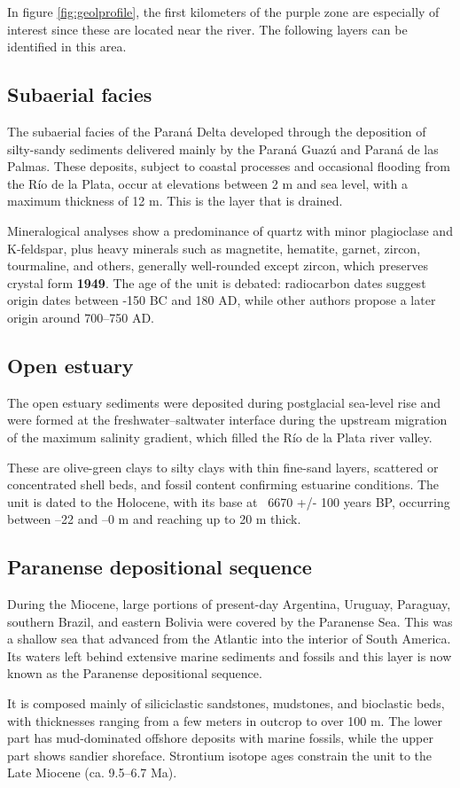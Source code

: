 In figure \ref{fig:geolprofile}, the first kilometers of the purple zone are especially of interest since these are located near the river. The following layers can be identified in this area.

\subsection{Subaerial facies}
The subaerial facies of the Paraná Delta developed through the deposition of silty-sandy sediments delivered mainly by the Paraná Guazú and Paraná de las Palmas. These deposits, subject to coastal processes and occasional flooding from the Río de la Plata, occur at elevations between 2 m and sea level, with a maximum thickness of 12 m. This is the layer that is drained.

Mineralogical analyses show a predominance of quartz with minor plagioclase and K-feldspar, plus heavy minerals such as magnetite, hematite, garnet, zircon, tourmaline, and others, generally well-rounded except zircon, which preserves crystal form \textbf{1949}. The age of the unit is debated: radiocarbon dates suggest origin dates between -150 BC and 180 AD, while other authors propose a later origin around 700–750 AD.

\subsection{Open estuary}
The open estuary sediments were deposited during postglacial sea-level rise and were formed at the freshwater–saltwater interface during the upstream migration of the maximum salinity gradient, which filled the Río de la Plata river valley.

These are olive-green clays to silty clays with thin fine-sand layers, scattered or concentrated shell beds, and fossil content confirming estuarine conditions. The unit is dated to the Holocene, with its base at ~6670 +/- 100 years BP, occurring between –22 and –0 m and reaching up to 20 m thick.

\subsection{Paranense depositional sequence}
During the Miocene, large portions of present-day Argentina, Uruguay, Paraguay, southern Brazil, and eastern Bolivia were covered by the Paranense Sea. This was a shallow sea that advanced from the Atlantic into the interior of South America. Its waters left behind extensive marine sediments and fossils and this layer is now known as the Paranense depositional sequence.

It is composed mainly of siliciclastic sandstones, mudstones, and bioclastic beds, with thicknesses ranging from a few meters in outcrop to over 100 m. The lower part has mud-dominated offshore deposits with marine fossils, while the upper part shows sandier shoreface. Strontium isotope ages constrain the unit to the Late Miocene (ca. 9.5–6.7 Ma).